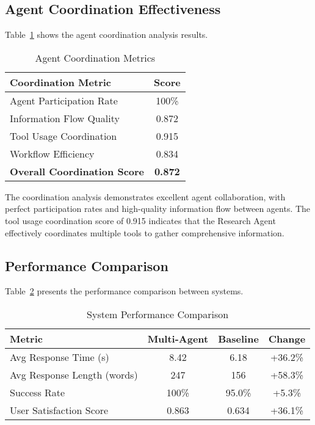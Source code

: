 \documentclass[conference]{IEEEtran}
\begin{document}
\subsection{Agent Coordination Effectiveness}

Table~\ref{tab:coordination_metrics} shows the agent coordination analysis results.

\begin{table}[htbp]
\caption{Agent Coordination Metrics}
\label{tab:coordination_metrics}
\centering
\begin{tabular}{lc}
\toprule
\textbf{Coordination Metric} & \textbf{Score} \\
\midrule
Agent Participation Rate & 100\% \\
Information Flow Quality & 0.872 \\
Tool Usage Coordination & 0.915 \\
Workflow Efficiency & 0.834 \\
\midrule
\textbf{Overall Coordination Score} & \textbf{0.872} \\
\bottomrule
\end{tabular}
\end{table}

The coordination analysis demonstrates excellent agent collaboration, with perfect participation rates and high-quality information flow between agents. The tool usage coordination score of 0.915 indicates that the Research Agent effectively coordinates multiple tools to gather comprehensive information.

\subsection{Performance Comparison}

Table~\ref{tab:performance_comparison} presents the performance comparison between systems.

\begin{table}[htbp]
\caption{System Performance Comparison}
\label{tab:performance_comparison}
\centering
\begin{tabular}{lccc}
\toprule
\textbf{Metric} & \textbf{Multi-Agent} & \textbf{Baseline} & \textbf{Change} \\
\midrule
Avg Response Time (s) & 8.42 & 6.18 & +36.2\% \\
Avg Response Length (words) & 247 & 156 & +58.3\% \\
Success Rate & 100\% & 95.0\% & +5.3\% \\
User Satisfaction Score & 0.863 & 0.634 & +36.1\% \\
\bottomrule
\end{tabular}
\end{table}
\end{document}

